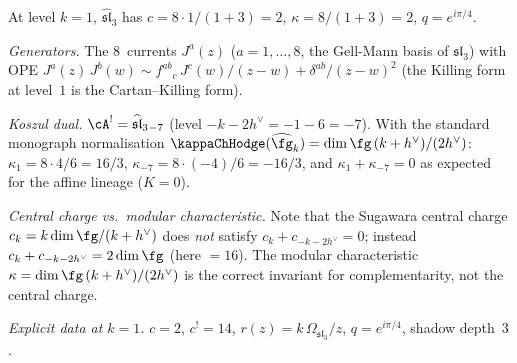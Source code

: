 \begin{computation}[Affine $\widehat{\mathfrak{sl}}_3$ at $k=1$:
explicit holographic quantisation; \ClaimStatusProvedHere]
\label{comp:sl3-k1-holographic}
At level $k=1$, $\widehat{\mathfrak{sl}}_3$ has
$c=8\cdot 1/(1+3)=2$,
$\kappa=8/(1+3)=2$,
$q=e^{i\pi/4}$.

\emph{Generators.}
The $8$~currents $J^a(z)$ ($a=1,\dots,8$, the Gell-Mann
basis of $\mathfrak{sl}_3$) with OPE
$J^a(z)\,J^b(w)\sim
f^{ab}{}_c\,J^c(w)/(z-w)
+\delta^{ab}/(z-w)^2$
(the Killing form at level~$1$ is the Cartan--Killing form).

\emph{Koszul dual.}
$\cA^!=\widehat{\mathfrak{sl}}_3{}_{-7}$ (level $-k-2h^\vee=-1-6=-7$).
With the standard monograph normalisation
$\kappaChHodge(\widehat{\fg}_k) = \dim\fg\,(k+h^\vee)/(2h^\vee)$:
$\kappa_1 = 8\cdot 4/6 = 16/3$,
$\kappa_{-7} = 8\cdot(-4)/6 = -16/3$,
and $\kappa_1+\kappa_{-7}=0$ as expected for the affine lineage
($K=0$).

\emph{Central charge vs.\ modular characteristic.}
Note that the Sugawara central charge $c_k = k\dim\fg/(k+h^\vee)$
does \emph{not} satisfy $c_k + c_{-k-2h^\vee} = 0$; instead
$c_k + c_{-k-2h^\vee} = 2\dim\fg$ (here $= 16$). The modular
characteristic $\kappa = \dim\fg\,(k+h^\vee)/(2h^\vee)$ is the
correct invariant for complementarity, not the central charge.

\emph{Explicit data at $k=1$.}
$c=2$, $c^!=14$,
$r(z)=k\,\Omega_{\mathfrak{sl}_3}/z$,
$q=e^{i\pi/4}$, shadow depth~$3$.
\end{computation}

